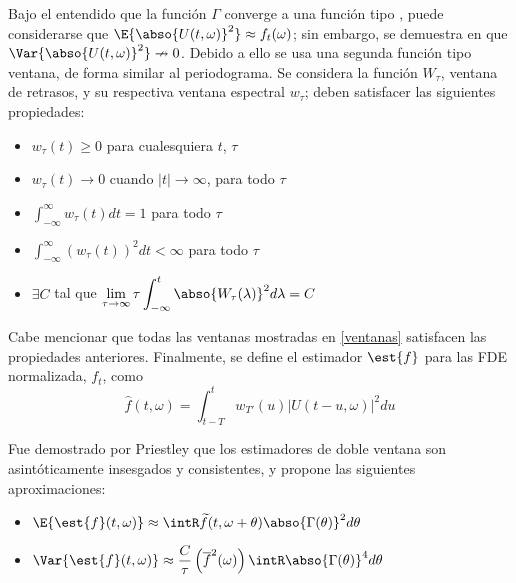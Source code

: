 Bajo el entendido que la funci\'on $\Gamma$ converge a una funci\'on tipo \dirac, puede 
considerarse que 
$\E{\abso{U(t,\omega)}^{2}} \approx f_t(\omega)$; sin embargo, se demuestra en \cite{Priestley66} 
que $\Var{\abso{U(t,\omega)}^{2}} \nrightarrow 0$.
%
Debido a ello se usa una segunda funci\'on tipo ventana,
de forma similar al periodograma.
Se considera la funci\'on $W_\tau$, ventana de retrasos, y su respectiva ventana espectral 
$w_\tau$; deben satisfacer las siguientes propiedades:
\begin{itemize}
\item $w_{\tau}(t) \geq 0$ para cualesquiera $t$, $\tau$
\item $w_{\tau}(t) \rightarrow 0$ cuando $\lvert t \lvert \rightarrow \infty$, para todo $\tau$
\item $\displaystyle \int_{-\infty}^{\infty} w_{\tau}(t) dt = 1$ para todo $\tau$
\item $\displaystyle \int_{-\infty}^{\infty} \left( w_{\tau}(t) \right)^{2} dt < \infty$ para todo $\tau$
\item $\exists C$ tal que  
$\displaystyle \lim_{\tau\rightarrow\infty} \tau \int_{-\infty}^{t} \abso{ W_{\tau}(\lambda) }^{2} d\lambda = C$
\end{itemize}

Cabe mencionar que todas las ventanas mostradas en \ref{ventanas} satisfacen las propiedades 
anteriores.
Finalmente, se define el estimador $\est{f}$ para las FDE normalizada, $f_t$, como
\begin{equation*}
\widehat{f}(t,\omega) = \int_{t-T}^{t} w_{T'}(u) \lvert U(t-u,\omega) \lvert^{2} du
\label{estimador_doble_ventana}
\end{equation*}

Fue demostrado por Priestley \cite{Priestley65} que los estimadores de doble ventana son 
asint\'oticamente insesgados y consistentes, y propone las siguientes aproximaciones:
\begin{itemize}
\item $\displaystyle
\E{\est{f}(t,\omega)} \approx 
\intR \widetilde{f}(t,\omega+\theta) \abso{\Gamma(\theta)}^{2} d\theta$
\item $\displaystyle
\Var{\est{f}(t,\omega)} \approx \frac{C}{\tau} \left( \overline{f}^{2}(\omega) \right)
\intR \abso{\Gamma(\theta)}^{4} d\theta $
\end{itemize}


